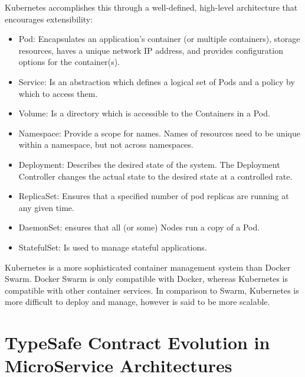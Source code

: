 Kubernetes accomplishes this through a well-defined, high-level architecture that encourages extensibility:

\begin{itemize}
    \item Pod: Encapsulates an application's container (or multiple containers),
    storage resources, haves a unique network IP address, and provides configuration options for the container(s).
    \item Service: Is an abstraction which defines a logical set
    of Pods and a policy by which to access them.
    \item Volume: Is a directory which is accessible to the
    Containers in a Pod.
    \item Namespace: Provide a scope for names. Names
    of resources need to be unique within a namespace, but not
    across namespaces.
    \item Deployment: Describes the desired state of the system. The
    Deployment Controller changes the actual state to the desired
    state at a controlled rate.
    \item ReplicaSet: Ensures that a specified number of pod replicas
    are running at any given time.
    \item DaemonSet: ensures that all (or some) Nodes run a copy of
    a Pod.
    \item StatefulSet: Is used to manage stateful applications.
\end{itemize}

Kubernetes is a more sophisticated container management system than Docker Swarm.
Docker Swarm is only compatible with Docker, whereas Kubernetes is compatible with other container services.
In comparison to Swarm, Kubernetes is more difficult to deploy and manage, however is said to be more scalable.

\section{TypeSafe Contract Evolution in MicroService Architectures} %
\label{sec:typesafe_contract_evolution_in_microservice_architectures}


